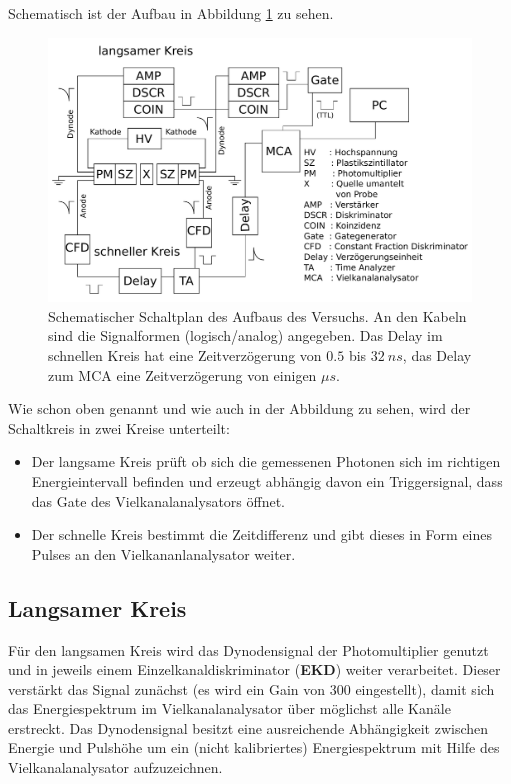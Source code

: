 \documentclass[a4paper,12pt]{article}
\begin{document}
Schematisch ist der Aufbau in Abbildung \ref{fig:schaltplan} zu sehen.
\begin{figure}[htb]
		\centering
		\includegraphics[width=1.0\textwidth]{Schaltplan_custom.pdf}
		\caption{Schematischer Schaltplan des Aufbaus des Versuchs.
		An den Kabeln sind die Signalformen (logisch/analog) angegeben.
		Das Delay im schnellen Kreis hat eine Zeitverzögerung von $0.5$ bis $\SI{32}{ns}$, das Delay
		zum MCA eine Zeitverzögerung von einigen $\si{μs}$.}
		\label{fig:schaltplan}
\end{figure}

Wie schon oben genannt und wie auch in der Abbildung zu sehen, wird der Schaltkreis in zwei Kreise unterteilt:
\begin{itemize}
	\item
	Der langsame Kreis prüft ob sich die gemessenen Photonen sich im richtigen Energieintervall 
	befinden und erzeugt abhängig davon ein Triggersignal, dass das Gate des Vielkanalanalysators öffnet.
	\item
		Der schnelle Kreis bestimmt die Zeitdifferenz und gibt dieses in Form eines Pulses an den
	Vielkananlanalysator weiter.
\end{itemize}
\subsection*{Langsamer Kreis}
Für den langsamen Kreis wird das Dynodensignal der Photomultiplier genutzt und in jeweils einem
Einzelkanaldiskriminator (\textbf{EKD}) weiter verarbeitet.
Dieser verstärkt das Signal zunächst (es wird ein Gain von 300 eingestellt),
damit sich das Energiespektrum im Vielkanalanalysator über möglichst alle Kanäle erstreckt.
Das Dynodensignal besitzt eine ausreichende Abhängigkeit zwischen Energie und Pulshöhe
um ein (nicht kalibriertes) Energiespektrum mit Hilfe des Vielkanalanalysator aufzuzeichnen.
\end{document}
